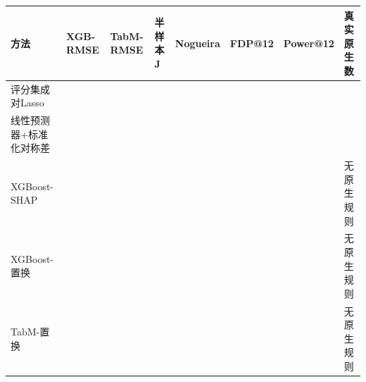 \documentclass[UTF8,11pt,a4paper]{ctexart}
\begin{document}
{\def\LTcaptype{none} %
{
\footnotesize
\begin{longtable}[]{@{}
  >{\raggedright\arraybackslash}p{}
  >{\raggedright\arraybackslash}p{}
  >{\raggedright\arraybackslash}p{}
  >{\raggedright\arraybackslash}p{}
  >{\raggedright\arraybackslash}p{}
  >{\raggedright\arraybackslash}p{}
  >{\raggedright\arraybackslash}p{}
  >{\raggedright\arraybackslash}p{}@{}}
\toprule\noalign{}
\begin{minipage}[b]{\linewidth}\raggedright
方法
\end{minipage} & \begin{minipage}[b]{\linewidth}\raggedright
XGB-RMSE
\end{minipage} & \begin{minipage}[b]{\linewidth}\raggedright
TabM-RMSE
\end{minipage} & \begin{minipage}[b]{\linewidth}\raggedright
半样本J
\end{minipage} & \begin{minipage}[b]{\linewidth}\raggedright
Nogueira
\end{minipage} & \begin{minipage}[b]{\linewidth}\raggedright
FDP@12
\end{minipage} & \begin{minipage}[b]{\linewidth}\raggedright
Power@12
\end{minipage} & \begin{minipage}[b]{\linewidth}\raggedright
真实原生数
\end{minipage} \\
\midrule\noalign{}
\endhead
\bottomrule\noalign{}
\endlastfoot
评分集成对Lasso & 1.9488 & 1.9765 & 0.3569 & 0.2067 & 0.5203 & 0.6590 & 0 \\
线性预测器+标准化对称差 & 2.0784 & 2.0687 & 0.4046 & 0.2352 & 0.4860 & 0.7002 & 0 \\
XGBoost-SHAP & 1.8466 & 1.8571 & 0.7682 & 0.7439 & 0.2629 & 0.9678 & 无原生规则 \\
XGBoost-置换 & 1.8478 & 1.8612 & 0.7853 & 0.7666 & 0.2514 & 0.9817 & 无原生规则 \\
TabM-置换 & 1.8458 & 1.8586 & 0.7288 & 0.6841 & 0.2594 & 0.9720 & 无原生规则 \\

\end{longtable}}}
\end{document}
